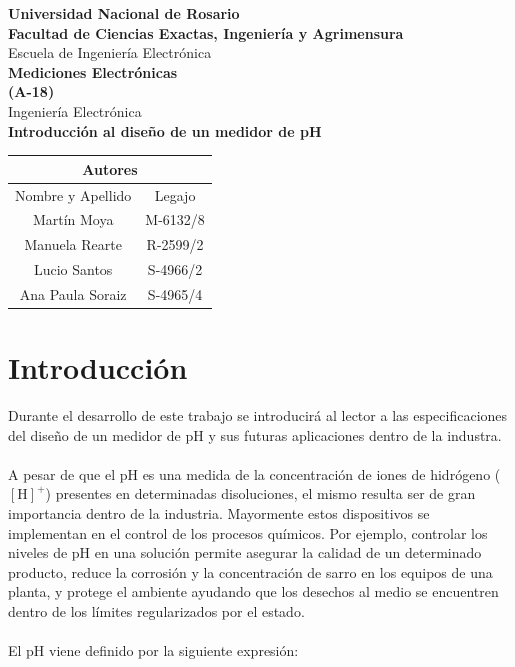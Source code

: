 \documentclass[10pt,a4paper]{article}
\begin{document}
\begin{titlepage}
\begin{center}
 \large{ \textbf{Universidad Nacional de Rosario}} \\[5mm]
 \textbf{Facultad de Ciencias Exactas, Ingeniería y Agrimensura} \\[5mm]
 Escuela de Ingeniería Electrónica \\[20mm]
 \Large {\textbf{Mediciones Electrónicas\\(A-18)}}\\[1.5mm]
 \small {Ingeniería Electrónica} \\[20mm]
 \LARGE{ \textbf{Introducción al diseño de un medidor de pH}} \\[15mm]

\end{center}
\vspace{10pt}
	
\begin{center}
\begin{tabular}{|c|c|}
\hline 
\multicolumn{2}{|c|}{Autores} \\ 
\hline 
Nombre y Apellido & Legajo \\ 
\hline 
Martín Moya  & M-6132/8 \\
\hline 
Manuela Rearte & R-2599/2\\
\hline
Lucio Santos & S-4966/2 \\  
\hline 
Ana Paula Soraiz & S-4965/4\\
\hline
\end{tabular}
\end{center}
\vfill

\end{titlepage}

\tableofcontents

\clearpage

\section{Introducción}

Durante el desarrollo de este trabajo se introducirá al lector a las especificaciones del diseño de un medidor de pH y sus futuras aplicaciones dentro de la industra.\\
\\
A pesar de que el pH es una medida de la concentración de iones de hidrógeno ($\mathrm{\left[H\right]^+}$) presentes en determinadas disoluciones, el mismo resulta ser de gran importancia dentro de la industria. Mayormente estos dispositivos se implementan en el control de los procesos químicos. Por ejemplo, controlar los niveles de pH en una solución permite asegurar la calidad de un determinado producto, reduce la corrosión y la concentración de sarro en los equipos de una planta, y protege el ambiente ayudando que los desechos al medio se encuentren dentro de los límites regularizados por el estado.\\
\\
El pH viene definido por la siguiente expresión:
\end{document}
